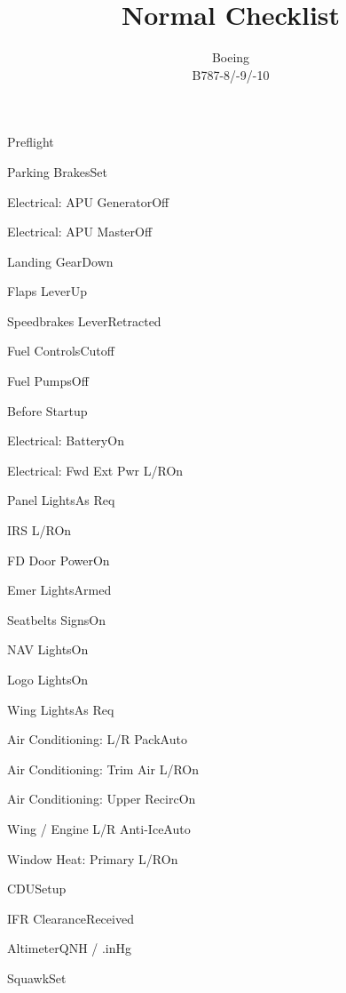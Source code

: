 \documentclass[sim-use]{checklist}
\title{Normal Checklist}
\subtitle{Boeing \\ B787-8/-9/-10}
\begin{document}
  

\begin{checklist}{Preflight}
  \item{Parking Brakes}{Set}
  \item{Electrical: APU Generator}{Off}
  \item{Electrical: APU Master}{Off}
  \item{Landing Gear}{Down}
  \item{Flaps Lever}{Up}
  \item{Speedbrakes Lever}{Retracted}
  \item{Fuel Controls}{Cutoff}
  \item{Fuel Pumps}{Off}
\end{checklist}

\begin{checklist}{Before Startup}
  \item{Electrical: Battery}{On}
  \item{Electrical: Fwd Ext Pwr L/R}{On}
  \item{Panel Lights}{As Req}
  \item{IRS L/R}{On}
  \item{FD Door Power}{On}
  \item{Emer Lights}{Armed}
  \item{Seatbelts Signs}{On}
  \item{NAV Lights}{On}
  \item{Logo Lights}{On}
  \item{Wing Lights}{As Req}
  \item{Air Conditioning: L/R Pack}{Auto}
  \item{Air Conditioning: Trim Air L/R}{On}
  \item{Air Conditioning: Upper Recirc}{On}
  \item{Wing / Engine L/R Anti-Ice}{Auto}
  \item{Window Heat: Primary L/R}{On}
  \item{CDU}{Setup}
  \item{IFR Clearance}{Received}
  \item{Altimeter}{\blank QNH / \blank.\blank inHg}
  \item{Squawk}{Set}
\end{checklist}
\end{document}
